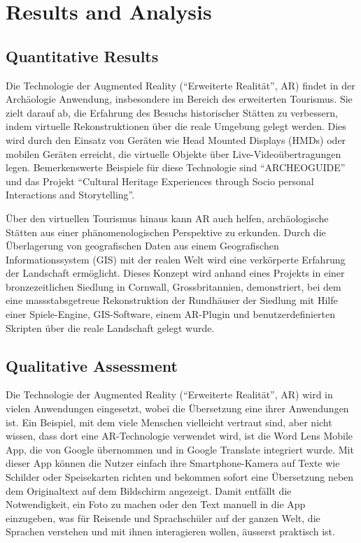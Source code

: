 \section{Results and Analysis}

\subsection{Quantitative Results}

Die Technologie der Augmented Reality (“Erweiterte Realität”, AR) findet in der Archäologie Anwendung, insbesondere im Bereich des erweiterten Tourismus. Sie zielt darauf ab, die Erfahrung des Besuchs historischer Stätten zu verbessern, indem virtuelle Rekonstruktionen über die reale Umgebung gelegt werden. Dies wird durch den Einsatz von Geräten wie Head Mounted Displays (HMDs) oder mobilen Geräten erreicht, die virtuelle Objekte über Live-Videoübertragungen legen. Bemerkenswerte Beispiele für diese Technologie sind “ARCHEOGUIDE” und das Projekt “Cultural Heritage Experiences through Socio personal Interactions and Storytelling”.

Über den virtuellen Tourismus hinaus kann AR auch helfen, archäologische Stätten aus einer phänomenologischen Perspektive zu erkunden. Durch die Überlagerung von geografischen Daten aus einem Geografischen Informationssystem (GIS) mit der realen Welt wird eine verkörperte Erfahrung der Landschaft ermöglicht. Dieses Konzept wird anhand eines Projekts in einer bronzezeitlichen Siedlung in Cornwall, Grossbritannien, demonstriert, bei dem eine massstabsgetreue Rekonstruktion der Rundhäuser der Siedlung mit Hilfe einer Spiele-Engine, GIS-Software, einem AR-Plugin und benutzerdefinierten Skripten über die reale Landschaft gelegt wurde. 
\cite{Archaeology}

\subsection{Qualitative Assessment}

Die Technologie der Augmented Reality (“Erweiterte Realität”, AR) wird in vielen Anwendungen eingesetzt, wobei die Übersetzung eine ihrer Anwendungen ist. Ein Beispiel, mit dem viele Menschen vielleicht vertraut sind, aber nicht wissen, dass dort eine AR-Technologie verwendet wird, ist die Word Lens Mobile App, die von Google übernommen und in Google Translate integriert wurde. Mit dieser App können die Nutzer einfach ihre Smartphone-Kamera auf Texte wie Schilder oder Speisekarten richten und bekommen sofort eine Übersetzung neben dem Originaltext auf dem Bildschirm angezeigt. Damit entfällt die Notwendigkeit, ein Foto zu machen oder den Text manuell in die App einzugeben, was für Reisende und Sprachschüler auf der ganzen Welt, die Sprachen verstehen und mit ihnen interagieren wollen, äusserst praktisch ist. \cite{QuestVisual_2010}



